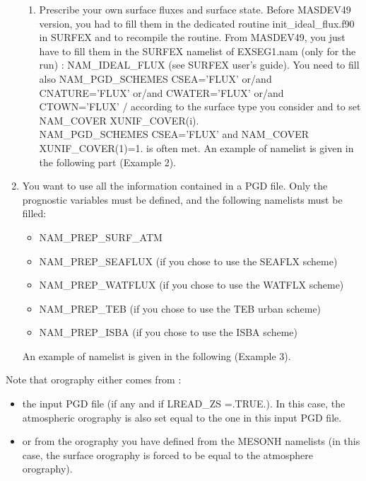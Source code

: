 \begin{enumerate}
\begin{enumerate}
\item Prescribe your own surface fluxes 
and surface state. Before MASDEV49 version, you had to fill them in the dedicated routine init\_ideal\_flux.f90
in SURFEX and to recompile the routine. From MASDEV49, you just have to fill them in the SURFEX namelist of 
EXSEG1.nam (only for the run) : NAM\_IDEAL\_FLUX (see SURFEX user's guide).
You need to fill also NAM\_PGD\_SCHEMES CSEA='FLUX' or/and
CNATURE='FLUX' or/and CWATER='FLUX' or/and CTOWN='FLUX' /
according to the surface type you consider and to set
NAM\_COVER XUNIF\_COVER(i).\\
NAM\_PGD\_SCHEMES CSEA='FLUX' and NAM\_COVER XUNIF\_COVER(1)=1. is often met.
An example of namelist is given in the following part (Example 2).
\end{enumerate}
 
\item You want to use all the information contained in a PGD file. Only the prognostic variables must be defined, and the following namelists must be filled:

\begin{itemize}
\item NAM\_PREP\_SURF\_ATM
\item NAM\_PREP\_SEAFLUX (if you chose to use the SEAFLX scheme)
\item NAM\_PREP\_WATFLUX (if you chose to use the WATFLX scheme)
\item NAM\_PREP\_TEB (if you chose to use the TEB urban scheme)
\item NAM\_PREP\_ISBA (if you chose to use the ISBA scheme)
\end{itemize}
An example of namelist is given in the following (Example 3).

\end{enumerate}

Note that orography either comes from :
\begin{itemize}
\item the input PGD file (if any and if LREAD\_ZS =.TRUE.). In this case, the atmospheric orography is also set equal to the one in this input PGD file.
\item or from the orography you have defined from the MESONH namelists (in this case, the surface orography is forced to be equal to the atmosphere orography).
\end{itemize}

